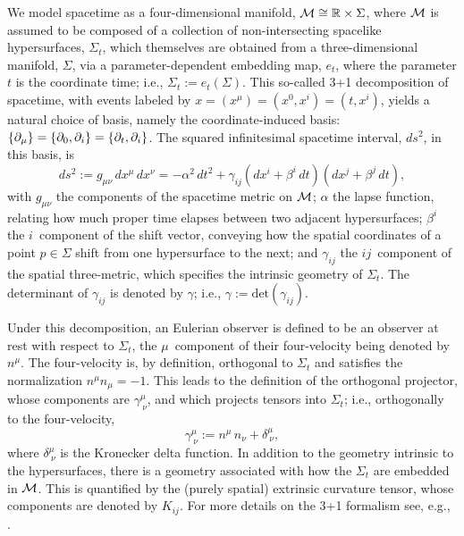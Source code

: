 We model spacetime as a four-dimensional manifold,
$\mathcal{M}\cong\mathbb{R}\times\Sigma$, where $\mathcal{M}$ is assumed to be composed
of a collection of non-intersecting spacelike hypersurfaces, $\Sigma_{t}$,
which themselves are obtained from a three-dimensional manifold,
$\Sigma$, via a parameter-dependent embedding map,
$e_{t}$, where the parameter $t$ is the coordinate time;
i.e., $\Sigma_{t}:=e_{t}\left(\Sigma\right)$.
This so-called 3+1 decomposition of spacetime, with events labeled by
$x=\left(x^{\mu}\right)=\left(x^{0},x^{i}\right)=\left(t,x^{i}\right)$,
yields a natural choice of
basis, namely the coordinate-induced basis:
$\left\{\partial_{\mu}\right\}=\left\{\partial_{0},\partial_{i}\right\}
=\left\{\partial_{t},\partial_{i}\right\}$.
The squared infinitesimal spacetime interval, $ds^{2}$, in this basis, is
\begin{equation}
  ds^{2}:=g_{\mu\nu}\,dx^{\mu}\,dx^{\nu}=-\alpha^{2}\,dt^{2}
  +\gamma_{ij}\left(dx^{i}+\beta^{i}\,dt\right)
  \left(dx^{j}+\beta^{j}\,dt\right),
\end{equation}
with $g_{\mu\nu}$ the components
of the spacetime metric on $\mathcal{M}$;
$\alpha$ the lapse function,
relating how much proper time elapses between two adjacent hypersurfaces;
$\beta^{i}$ the $i$\myth\ component of the shift vector,
conveying how the spatial coordinates of a
point $p\in\Sigma$ shift from one hypersurface to the next;
and $\gamma_{ij}$ the $ij$\myth\ component of
the spatial three-metric, which specifies the intrinsic geometry of
$\Sigma_{t}$.
The determinant of $\gamma_{ij}$ is denoted by $\gamma$; i.e.,
$\gamma:=\mathrm{det}\left(\gamma_{ij}\right)$.

Under this decomposition, an Eulerian observer is defined to be an
observer at rest with respect to $\Sigma_{t}$, the $\mu$\myth\ component of their
four-velocity being denoted by $n^{\mu}$.
The four-velocity is, by definition, orthogonal to $\Sigma_{t}$ and satisfies
the normalization $n^{\mu}n_{\mu}=-1$.
This leads to the definition of the orthogonal projector,
whose components are $\gamma^{\mu}_{~\nu}$,
and which projects tensors into $\Sigma_{t}$;
i.e., orthogonally to the four-velocity,
\begin{equation}
  \gamma^{\mu}_{~\nu}:=n^{\mu}\,n_{\nu}+\delta^{\mu}_{~\nu},
\end{equation}
where $\delta^{\mu}_{~\nu}$ is the Kronecker delta function.
In addition to the geometry intrinsic to the hypersurfaces, there is a geometry
associated with how the $\Sigma_{t}$ are embedded in $\mathcal{M}$.
This is quantified by the (purely spatial) extrinsic curvature tensor,
whose components are denoted by $K_{ij}$.
For more details on the 3+1 formalism
see, e.g., \citet{bs2010,g2012,rz2013}.

